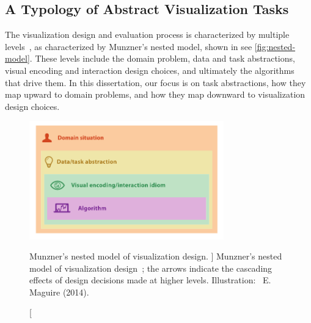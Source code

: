 
\subsection{A Typology of Abstract Visualization Tasks}
\label{intro:p1}


The visualization design and evaluation process is characterized by multiple levels~\cite{Munzner2009, Munzner2014}, as characterized by Munzner's nested model, shown in see \autoref{fig:nested-model}.
These levels include the domain problem, data and task abstractions, visual encoding and interaction design choices, and ultimately the algorithms that drive them.
In this dissertation, our focus is on task abstractions, how they map upward to domain problems, and how they map downward to visualization design choices.


\begin{figure}
	\centering
    \includegraphics[width=0.75\textwidth]{figures/fig4-2.pdf}
    \caption
    [
        Munzner's nested model of visualization design.
    ]
    {
        Munzner's nested model of visualization design~\cite{Munzner2009,Munzner2014}; the arrows indicate the cascading effects of design decisions made at higher levels. Illustration: \ccLogo~E. Maguire (2014).
    }
	\centering
	\label{fig:nested-model}
\end{figure}


